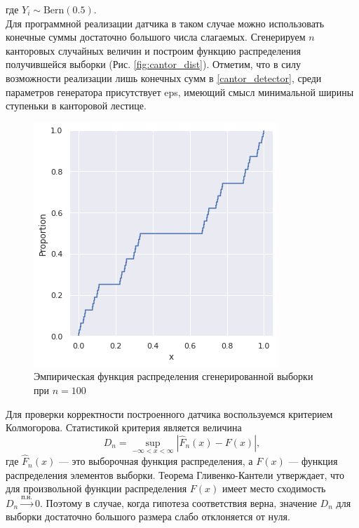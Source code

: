 где $ Y_i \sim \mathrm{Bern(0.5)}. $\\
Для программной реализации датчика в таком случае можно использовать конечные суммы
 достаточно большого числа слагаемых. Сгенерируем $ n $ канторовых случайных
 величин и построим функцию распределения получившейся выборки (Рис. \eqref{fig:cantor_dist}). Отметим,
 что в силу возможности реализации лишь конечных сумм в \eqref{cantor_detector},
 среди параметров генератора присутствует eps, имеющий смысл минимальной
 ширины ступеньки в канторовой лестице.
 
 \begin{figure}[ht]
	\centering
	\includegraphics[width=0.7\linewidth]{"./resources/stairs.png"}
	\caption{Эмпирическая функция распределения сгенерированной выборки при $ n = 100 $}
     \label{fig:cantor_dist}
\end{figure}

Для проверки корректности построенного датчика воспользуемся
 критерием Колмогорова. Статистикой критерия является величина
\begin{equation}\label{kolm_statistic}
     D_n = \sup_{-\infty < x < \infty} | \hat{F}_n(x) - F(x)|,
\end{equation}
где $ \hat{F}_n(x) $ --- это выборочная функция распределения, а $ F(x) $
 --- функция распределения элементов выборки. Теорема Гливенко-Кантели
 утверждает, что для произвольной функции распределения $ F(x) $
 имеет место сходимость $ D_n \xrightarrow{\text{п.н.}} 0. $ Поэтому в случае,
 когда гипотеза соответствия верна, значение $ D_n $ для выборки достаточно
 большого размера слабо отклоняется от нуля.


